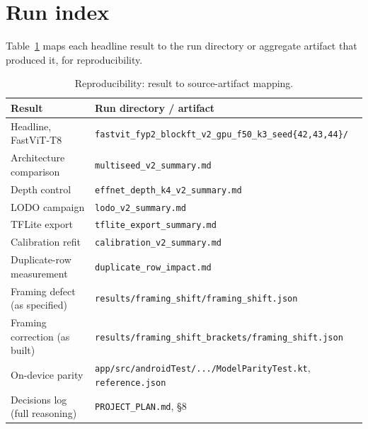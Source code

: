 \documentclass{article}
\begin{document}
\section{Run index}

Table~\ref{tab:runindex} maps each headline result to the run directory or aggregate artifact that
produced it, for reproducibility.

\begin{table}[h]
\centering
\caption{Reproducibility: result to source-artifact mapping.}
\label{tab:runindex}
\begin{tabular}{@{}p{4.6cm}p{8.8cm}@{}}
\toprule
Result & Run directory / artifact \\
\midrule
Headline, FastViT-T8 & \texttt{fastvit\_fyp2\_blockft\_v2\_gpu\_f50\_k3\_seed\{42,43,44\}/} \\
Architecture comparison & \texttt{multiseed\_v2\_summary.md} \\
Depth control & \texttt{effnet\_depth\_k4\_v2\_summary.md} \\
LODO campaign & \texttt{lodo\_v2\_summary.md} \\
TFLite export & \texttt{tflite\_export\_summary.md} \\
Calibration refit & \texttt{calibration\_v2\_summary.md} \\
Duplicate-row measurement & \texttt{duplicate\_row\_impact.md} \\
Framing defect (as specified) & \texttt{results/framing\_shift/framing\_shift.json} \\
Framing correction (as built) & \texttt{results/framing\_shift\_brackets/framing\_shift.json} \\
On-device parity & \texttt{app/src/androidTest/.../ModelParityTest.kt}, \texttt{reference.json} \\
Decisions log (full reasoning) & \texttt{PROJECT\_PLAN.md}, \S8 \\
\bottomrule
\end{tabular}
\end{table}
\end{document}
